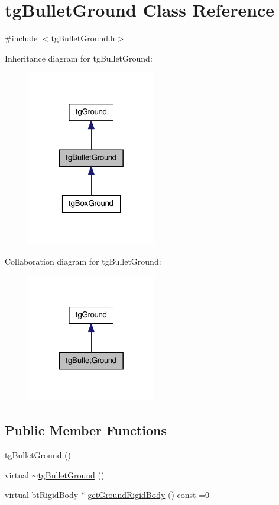 \hypertarget{classtg_bullet_ground}{\section{tg\-Bullet\-Ground Class Reference}
\label{classtg_bullet_ground}
}


{\ttfamily \#include $<$tg\-Bullet\-Ground.\-h$>$}



Inheritance diagram for tg\-Bullet\-Ground\-:\nopagebreak
\begin{figure}[H]
\begin{center}
\leavevmode
\includegraphics[width=160pt]{classtg_bullet_ground__inherit__graph}
\end{center}
\end{figure}


Collaboration diagram for tg\-Bullet\-Ground\-:\nopagebreak
\begin{figure}[H]
\begin{center}
\leavevmode
\includegraphics[width=160pt]{classtg_bullet_ground__coll__graph}
\end{center}
\end{figure}
\subsection*{Public Member Functions}
\begin{DoxyCompactItemize}
\item 
\hyperlink{classtg_bullet_ground_a7632ee953543952fa1960c70d74aa98f}{tg\-Bullet\-Ground} ()
\item 
virtual \hyperlink{classtg_bullet_ground_ae19385cba106c307ce6d306eec84f217}{$\sim$tg\-Bullet\-Ground} ()
\item 
virtual bt\-Rigid\-Body $\ast$ \hyperlink{classtg_bullet_ground_a9a6ce685977283feae2becf4f705e4cd}{get\-Ground\-Rigid\-Body} () const =0
\end{DoxyCompactItemize}
